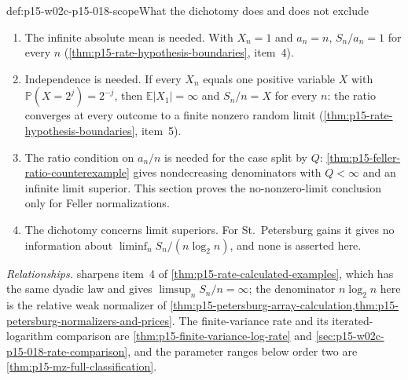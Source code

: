 \begin{hbwarning}{def:p15-w02c-p15-018-scope}{What the dichotomy does and does not exclude}
\begin{enumerate}
\item The infinite absolute mean is needed. With \(X_n=1\) and
\(a_n=n\), \(S_n/a_n=1\) for every \(n\)
(\cref{thm:p15-rate-hypothesis-boundaries}, item~4).
\item Independence is needed. If every \(X_n\) equals one positive
variable \(X\) with \(\mathbb P(X=2^j)=2^{-j}\), then
\(\mathbb E|X_1|=\infty\) and \(S_n/n=X\) for every \(n\): the ratio
converges at every outcome to a finite nonzero random limit
(\cref{thm:p15-rate-hypothesis-boundaries}, item~5).
\item The ratio condition on \(a_n/n\) is needed for the case split by
\(Q\): \cref{thm:p15-feller-ratio-counterexample} gives nondecreasing
denominators with \(Q<\infty\) and an infinite limit superior. This
section proves the no-nonzero-limit conclusion only for Feller
normalizations.
\item The dichotomy concerns limit superiors. For St.~Petersburg gains it
gives no information about \(\liminf_nS_n/(n\log_2n)\), and none is
asserted here.
\end{enumerate}
\end{hbwarning}

\emph{Relationships.} 
sharpens item~4 of \cref{thm:p15-rate-calculated-examples}, which has
the same dyadic law and gives \(\limsup_nS_n/n=\infty\); the denominator
\(n\log_2n\) here is the relative weak normalizer of
\cref{thm:p15-petersburg-array-calculation,thm:p15-petersburg-normalizers-and-prices}.
The finite-variance rate and its iterated-logarithm comparison are
\cref{thm:p15-finite-variance-log-rate} and
\cref{sec:p15-w02c-p15-018-rate-comparison}, and the parameter ranges
below order two are \cref{thm:p15-mz-full-classification}.

